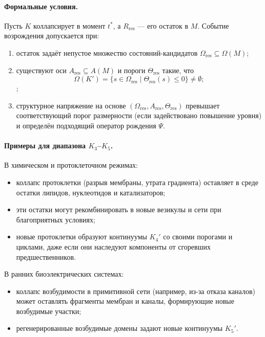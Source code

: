 \paragraph{Формальные условия.}
Пусть \(K\) коллапсирует в момент \(t^{\ast}\), а \(R_{\mathrm{res}}\) — его
остаток в \(M\). Событие возрождения допускается при:
\begin{enumerate}
  \item остаток задаёт непустое множество состояний-кандидатов
        \(\Omega_{\mathrm{res}}\subseteq \Omega(M)\);
  \item существуют оси \(A_{\mathrm{res}}\subseteq A(M)\) и пороги
        \(\Theta_{\mathrm{res}}\) такие, что
        \[
          \Omega(K') =
            \{ s\in \Omega_{\mathrm{res}}
               \mid \Theta_{\mathrm{res}}(s)\le 0
            \}
          \neq \emptyset;
        \];
  \item структурное напряжение на основе
        \((\Omega_{\mathrm{res}},A_{\mathrm{res}},
        \Theta_{\mathrm{res}})\) превышает соответствующий порог
        размерности (если задействовано повышение уровня) и определён
        подходящий оператор рождения \(\Psi\).
\end{enumerate}

\paragraph{Примеры для диапазона \texorpdfstring{\(K_3\)}{K_3}–\texorpdfstring{\(K_5\)}{K_5}.}
В химическом и протоклеточном режимах:
\begin{itemize}
  \item коллапс протоклетки (разрыв мембраны, утрата градиента) оставляет в среде
        остатки липидов, нуклеотидов и катализаторов;
  \item эти остатки могут рекомбинировать в новые везикулы и сети при
        благоприятных условиях;
  \item новые протоклетки образуют континуумы \(K_4'\) со своими порогами и
        циклами, даже если они наследуют компоненты от сгоревших предшественников.
\end{itemize}

В ранних биоэлектрических системах:
\begin{itemize}
  \item коллапс возбудимости в примитивной сети (например, из-за отказа
        каналов) может оставлять фрагменты мембран и каналы, формирующие новые
        возбудимые участки;
  \item регенерированные возбудимые домены задают новые континуумы \(K_5'\).
\end{itemize}

